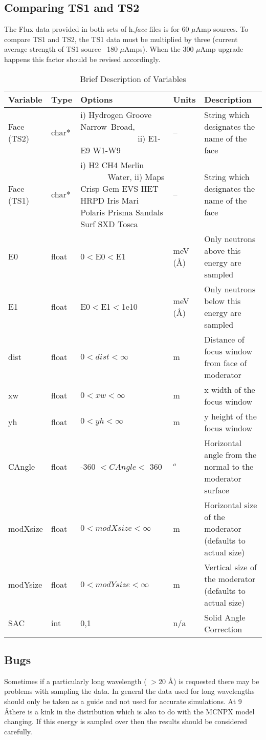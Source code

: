 \subsection{Comparing TS1 and TS2}
The Flux data provided in both sets of h.{\it{face}} files is for 60 {$\mu$}Amp sources. To compare TS1 and TS2, the TS1 data must be multiplied by three (current average strength of TS1 source ~180 {$\mu$}Amps). When the 300 {$\mu$}Amp upgrade happens this factor should be revised accordingly.
\begin{table}[tbp]
\begin{center}
\begin{tabular}{|p{0.7in}|p{0.4in}|p{1.7in}|p{0.35in}|p{2.0in}|}
\hline
Variable & Type & Options & Units & Description \\
\hline Face (TS2) & char* &  i) Hydrogen Groove Narrow~Broad,
~~~~~~~~~~~~~~ii) E1-E9 W1-W9 & -- &
String which designates the name of the face \\
\hline Face (TS1) & char* &  i) H2 CH4 Merlin ~~~~~~ Water,  ii)
Maps Crisp Gem EVS HET HRPD Iris Mari Polaris Prisma Sandals Surf
SXD Tosca & -- &
String which designates the name of the face \\
\hline
E0 & float & 0$<$E0$<$E1 & meV (\AA) & Only neutrons above this energy are sampled
\\
E1 & float & E0$<$E1$<$1e10 & meV (\AA) & Only neutrons below this energy are
sampled \\
\hline
dist & float & $0< dist <\infty$ & m & Distance of focus window from
face of moderator \\
xw & float & $0<xw<\infty$ & m & x width of the focus window  \\
yh & float & $0<yh<\infty$ & m & y height of the focus window  \\
\hline
CAngle & float & -360 $< CAngle <$ 360 & $^o$ & Horizontal angle from
the normal to the moderator surface\\
\hline
modXsize & float & $0<modXsize<\infty$ & m & Horizontal size of the
moderator (defaults to actual size) \\
modYsize & float & $0<modYsize<\infty$ & m & Vertical size of the
moderator (defaults to actual size) \\
\hline
SAC & int & 0,1 & n/a & Solid Angle Correction \\
\hline
\end{tabular}
\caption{Brief Description of Variables}
\label{vars}
\end{center}
\end{table}

\subsection{Bugs}

Sometimes if a particularly long wavelength ( $> 20$ \AA) is requested there may be problems with sampling the data. In general the data used for long wavelengths should only be taken as a guide and not used for accurate simulations. At 9 \AA there is a kink in the distribution which is also to do with the MCNPX model changing. If this energy is sampled over then the results should be considered carefully.

